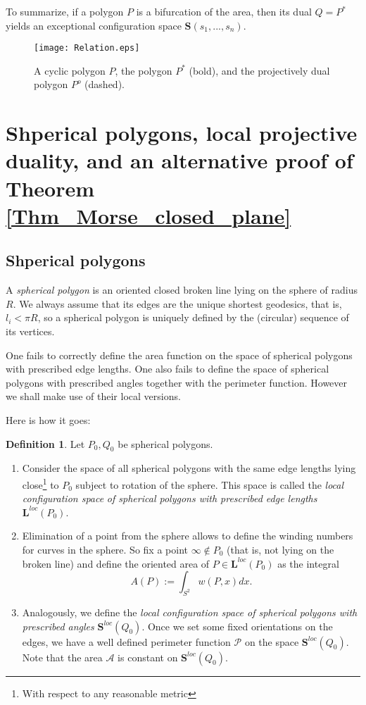 \documentclass[12pt]{amsart}
\theoremstyle{plain}
\theoremstyle{definition}
\newtheorem{definition}{Definition}
\theoremstyle{remark}
\theoremstyle{plain}
\theoremstyle{definition}
\begin{document}
To summarize, if a polygon $P$ is a bifurcation of the area, then its dual $Q=P^*$  yields an exceptional configuration space $\mathbf{S}(s_1,...,s_n)$.



\begin{figure}[h]
\centering \texttt{[image: Relation.eps]}
\caption{ A cyclic polygon $P$, the polygon $P^*$ (bold), and the projectively dual polygon $P^o$ (dashed).}\label{FigRelation}
\end{figure}

\section{Shperical polygons, local projective duality, and an alternative proof of Theorem \ref{Thm_Morse_closed_plane}}

\subsection{Shperical polygons}

A \textit{spherical polygon} is an oriented closed broken line lying on the sphere of radius $R$. We always assume that its edges are the unique shortest geodesics, that is,  $l_i<\pi R$, so a spherical polygon is uniquely defined by the (circular) sequence of its vertices.

One fails to  correctly define the area function on the space of spherical polygons with  prescribed edge lengths. One also fails to define  the space of spherical polygons with  prescribed angles  together with the perimeter function.  However we shall make use of their local versions.

Here is how it goes:

\begin{definition}
  Let $P_0, Q_0$ be  spherical polygons.
  \begin{enumerate}
    \item Consider the space of all spherical polygons with the same edge lengths lying close\footnote{With respect to any reasonable metric} to $P_0$ subject to rotation of the sphere.  This space is  called the \textit{local configuration space }\textit{of spherical polygons with prescribed edge lengths} $\mathbf{L}^{loc}(P_0)$.
    \item Elimination of a point from the sphere allows to define the winding numbers for curves  in the sphere. So fix a point $\infty\notin P_0$ (that is, not lying on the broken line) and define the oriented area  of $P\in \mathbf{L}^{loc}(P_0)$  as the integral
        $$A(P):=\int_{S^2} w(P,x)dx.$$
    \item Analogously, we define the \textit{local configuration space of spherical polygons with prescribed angles} $\mathbf{S}^{loc}(Q_0)$. Once we set  some fixed orientations on the edges, we have a well defined perimeter function $\mathcal{P}$  on the space $\mathbf{S}^{loc}(Q_0)$. Note that the area $\mathcal{A}$ is constant on $\mathbf{S}^{loc}(Q_0)$.
  \end{enumerate}
\end{definition}
\end{document}
